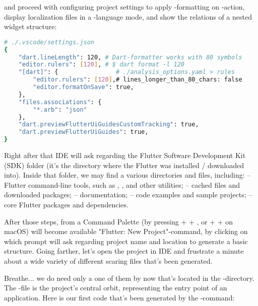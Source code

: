 \noindent and proceed with configuring project settings to apply -formatting on -action, display 
localization files in a -language mode, and show the relations of a nested widget structure:

\begin{lstlisting}[language=bash]
# ./.vscode/settings.json 
{
    "dart.lineLength": 120, # Dart-formatter works with 80 symbols
    "editor.rulers": [120], # $ dart format -l 120
    "[dart]": {                # ./analysis_options.yaml > rules
        "editor.rulers": [120],# lines_longer_than_80_chars: false
        "editor.formatOnSave": true,
    },
    "files.associations": {
        "*.arb": "json"
    },
    "dart.previewFlutterUiGuidesCustomTracking": true,
    "dart.previewFlutterUiGuides": true,
}
\end{lstlisting}

\noindent Right after that IDE will ask regarding the Flutter Software Development Kit (SDK) folder (it's the directory 
where the Flutter was installed / downloaded into). Inside that folder, we may find a various directories and files, 
including:
 -- Flutter command-line tools, such as , , and other utilities;
 -- cached files and downloaded packages;
 -- documentation;
 -- code examples and sample projects;
 -- core Flutter packages and dependencies.

After those steps, from a Command Palette (by pressing  +  + , or  +  + 
 on macOS) will become available "Flutter: New Project"-command, by clicking on which prompt will ask regarding
project name and location to generate a basic structure. Going farther, let's open the project in IDE and frustrate a 
minute about a wide variety of different scaring files that's been generated. 

\newpage
\noindent Breathe... we do need only a one of them by now that's located in the -directory. The 
-file is the project's central orbit, representing the entry point of an application. Here is our first 
code that's been generated by the -command:

